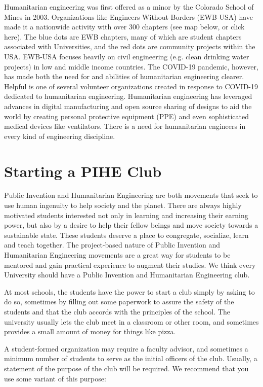 \documentclass[
	fontsize=10pt, %
	twoside=false, %
	secnumdepth=1, %
]{kaobook}
\begin{document}
Humanitarian engineering was first offered as a minor by the Colorado
School of Mines in 2003. Organizations like Engineers Without Borders
(EWB-USA) have made it a nationwide activity with over 300 chapters
(see map below, or click here). The blue dots are EWB chapters, many
of which are student chapters associated with Universities, and the
red dots are community projects within the USA. EWB-USA focuses
heavily on civil engineering (e.g. clean drinking water projects) in
low and middle income countries. The COVID-19 pandemic, however, has
made both the need for and abilities of humanitarian engineering
clearer. Helpful is one of several volunteer organizations created in
response to COVID-19 dedicated to humanitarian
engineering. Humanitarian engineering has leveraged advances in
digital manufacturing and open source sharing of designs to aid the
world by creating personal protective equipment (PPE) and even
sophisticated medical devices like ventilators. There is a need for
humanitarian engineers in every kind of engineering discipline.

\section{Starting a PIHE Club}

Public Invention and Humanitarian Engineering are both movements that seek to use human ingenuity to help society and the planet. There are always highly motivated students interested not only in learning and increasing their earning power, but also by a desire to help their fellow beings and move society towards a sustainable state. These students deserve a place to congregate, socialize, learn and teach together. The project-based nature of Public Invention and Humanitarian Engineering movements are a great way for students to be mentored and gain practical experience to augment their studies. We think every University should have a Public Invention and Humanitarian Engineering club.

At most schools, the students have the power to start a club simply by asking to do so, sometimes by filling out some paperwork to assure the safety of the students and that the club accords with the principles of the school. The university usually lets the club meet in a classroom or other room, and sometimes provides a small amount of money for things like pizza.

A student-formed organization may require a faculty advisor, and sometimes a minimum number of students to serve as the initial officers of the club. Usually, a statement of the purpose of the club will be required. We recommend that you use some variant of this purpose:
\end{document}
